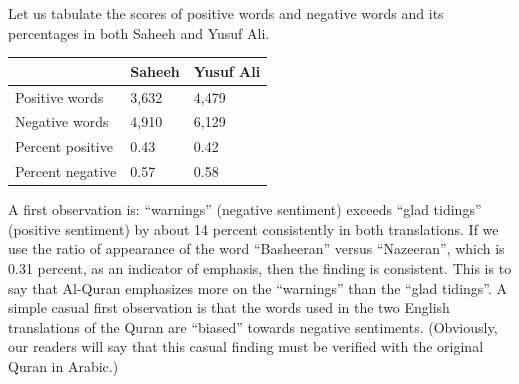 \documentclass[
]{article}
\newenvironment{Shaded}{\begin{snugshade}}{\end{snugshade}}
\newcommand{\FunctionTok}[1]{\textcolor[rgb]{0.13,0.29,0.53}{\textbf{#1}}}
\newcommand{\NormalTok}[1]{#1}
\newcommand{\OtherTok}[1]{\textcolor[rgb]{0.56,0.35,0.01}{#1}}
\newcommand{\SpecialCharTok}[1]{\textcolor[rgb]{0.81,0.36,0.00}{\textbf{#1}}}
\newcommand{\StringTok}[1]{\textcolor[rgb]{0.31,0.60,0.02}{#1}}
\begin{document}
\begin{Shaded}
\end{Shaded}

\normalsize

Let us tabulate the scores of positive words and negative words and its percentages in both Saheeh and Yusuf Ali.

\begin{longtable}[]{@{}lll@{}}
\toprule\noalign{}
& Saheeh & Yusuf Ali \\
\midrule\noalign{}
\endhead
\bottomrule\noalign{}
\endlastfoot
Positive words & 3,632 & 4,479 \\
Negative words & 4,910 & 6,129 \\
Percent positive & 0.43 & 0.42 \\
Percent negative & 0.57 & 0.58 \\
\end{longtable}

A first observation is: ``warnings'' (negative sentiment) exceeds ``glad tidings'' (positive sentiment) by about 14 percent consistently in both translations. If we use the ratio of appearance of the word ``Basheeran'' versus ``Nazeeran'', which is 0.31 percent, as an indicator of emphasis, then the finding is consistent. This is to say that Al-Quran emphasizes more on the ``warnings'' than the ``glad tidings''. A simple casual first observation is that the words used in the two English translations of the Quran are ``biased'' towards negative sentiments. (Obviously, our readers will say that this casual finding must be verified with the original Quran in Arabic.)
\end{document}
